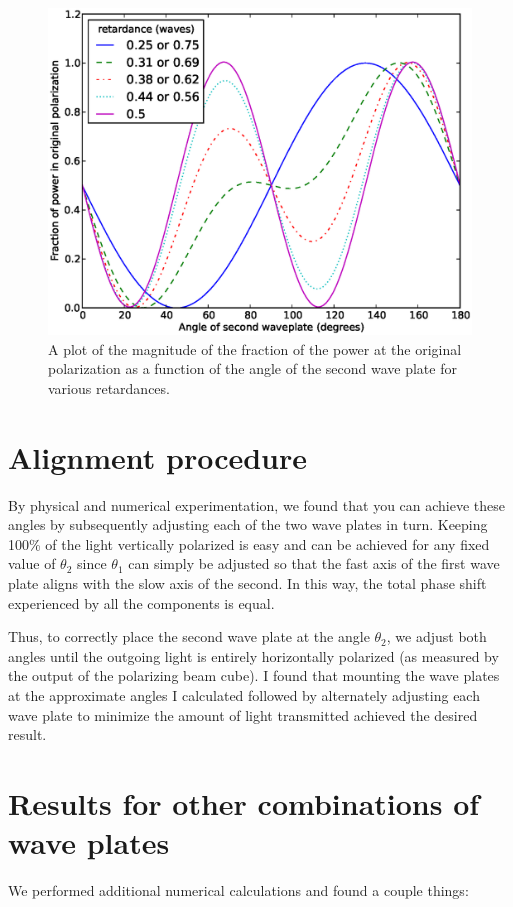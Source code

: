\begin{figure}
    \centerline{\includegraphics[width=.9\textwidth]{NewNotesSymmetricFig}}
    \caption[Transmitted power vs angle]{\label{fig:numericalLightControlMethod}
    A plot of the magnitude of the fraction of the power at the original polarization as a function of the angle of the second wave plate for various retardances.}
\end{figure}


\section{Alignment procedure}
By physical and numerical experimentation, we found that you can achieve these angles by subsequently adjusting each of the two wave plates in turn. Keeping 100\% of the light vertically polarized is easy and can be achieved for any fixed value of $\theta_2$ since $\theta_1$ can simply be adjusted so that the fast axis of the first wave plate aligns with the slow axis of the second. In this way, the total phase shift experienced by all the components is equal.

Thus, to correctly place the second wave plate at the angle  $\theta_2$, we adjust both angles until the outgoing light is entirely horizontally polarized (as measured by the output of the polarizing beam cube). I found that mounting the wave plates at the approximate angles I calculated followed by alternately adjusting each wave plate to minimize the amount of light transmitted achieved the desired result. 

\section{Results for other combinations of wave plates}
We performed additional numerical calculations and found a couple things:

